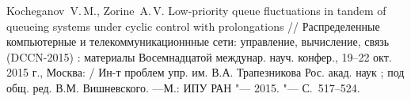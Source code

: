 \begin{ptkarticle}[russian]
\begin{ptkreferences}
\item
Kocheganov~V.\,M., Zorine~A.\,V. Low-priority queue fluctuations in tandem of queueing systems under cyclic control with prolongations // Распределенные компьютерные и телекоммуникационнные сети: управление, вычисление, связь (DCCN-2015) : материалы Восемнадцатой междунар. науч. конфер., 19–22 окт. 2015 г., Москва: / Ин-т проблем упр. им. В.А. Трапезникова Рос. акад. наук ; под общ. ред. В.М. Вишневского. —М.: ИПУ РАН "--- 2015. "--- С.~517--524.


\end{ptkreferences}

\end{ptkarticle}    


